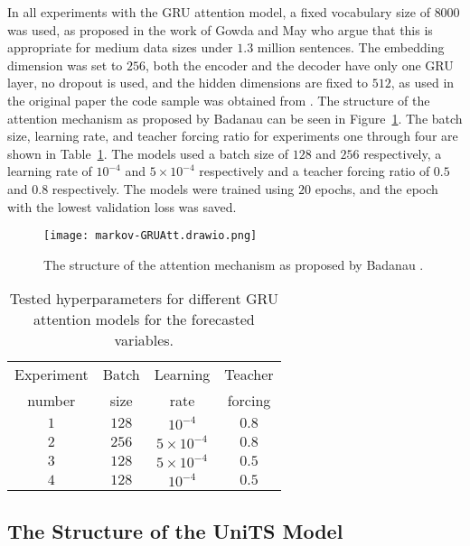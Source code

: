 \documentclass[preprint,12pt]{elsarticle}
\begin{document}
In all experiments with the GRU attention model, a fixed vocabulary size of $8000$ was used, as proposed in the work of Gowda and May \citep{gowda2020finding} who argue that this is appropriate for medium data sizes under $1.3$ million sentences. The embedding dimension was set to $256$, both the encoder and the decoder have only one GRU layer, no dropout is used, and the hidden dimensions are fixed to $512$, as used in the original paper the code sample was obtained from \citep{Hiemsch2023}. The structure of the attention mechanism as proposed by Badanau \cite{bahdanau2014neural} can be seen in Figure~\ref{fig:layersGRUAtt}. The batch size, learning rate, and teacher forcing ratio for experiments one through four are shown in Table~\ref{tab:experimentGRUAtt}. The models used a batch size of $128$ and $256$ respectively, a learning rate of $10^{-4}$ and $5\times 10^{-4}$ respectively and a teacher forcing ratio of $0.5$ and $0.8$ respectively. The models were trained using $20$ epochs, and the epoch with the lowest validation loss was saved.

\begin{figure}[!ht]
    \centering
    \texttt{[image: markov-GRUAtt.drawio.png]}
    \caption{The structure of the attention mechanism as proposed by Badanau \cite{bahdanau2014neural}.}
    \label{fig:layersGRUAtt}
\end{figure}

\begin{table}[!ht]
    \centering
    \begin{tabular}{|c|c|c|c|} \hline
        Experiment & Batch & Learning & Teacher \\
        number & size & rate & forcing \\ \hline
        $1$ & $128$ & $10^{-4}$ & $0.8$ \\ \hline
        $2$ & $256$ & $5\times 10^{-4}$ & $0.8$ \\ \hline
        $3$ & $128$ & $5\times 10^{-4}$ & $0.5$ \\ \hline
        $4$ & $128$ & $10^{-4}$ & $0.5$ \\ \hline
    \end{tabular}
    \caption{Tested hyperparameters for different GRU attention models for the forecasted variables.}
    \label{tab:experimentGRUAtt}
\end{table}

\subsection{The Structure of the UniTS Model}
\end{document}
